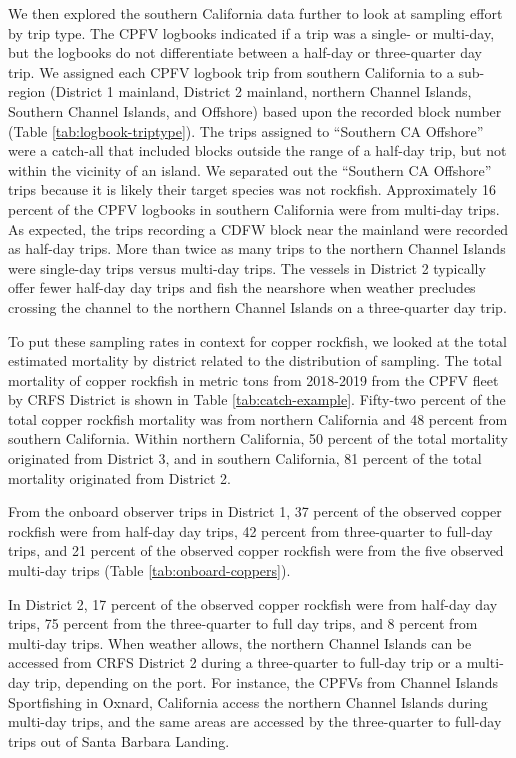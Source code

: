 \documentclass[11pt,
  english,
  letterpaper,
]{article}
\begin{document}
We then explored the southern California data further to look at sampling effort by trip type. The CPFV logbooks indicated if a trip was a single- or multi-day, but the logbooks do not differentiate between a half-day or three-quarter day trip. We assigned each CPFV logbook trip from southern California to a sub-region (District 1 mainland, District 2 mainland, northern Channel Islands, Southern Channel Islands, and Offshore) based upon the recorded block number (Table \ref{tab:logbook-triptype}). The trips assigned to ``Southern CA Offshore'' were a catch-all that included blocks outside the range of a half-day trip, but not within the vicinity of an island. We separated out the ``Southern CA Offshore'' trips because it is likely their target species was not rockfish. Approximately 16 percent of the CPFV logbooks in southern California were from multi-day trips. As expected, the trips recording a CDFW block near the mainland were recorded as half-day trips. More than twice as many trips to the northern Channel Islands were single-day trips versus multi-day trips. The vessels in District 2 typically offer fewer half-day day trips and fish the nearshore when weather precludes crossing the channel to the northern Channel Islands on a three-quarter day trip.

To put these sampling rates in context for copper rockfish, we looked at the total estimated mortality by district related to the distribution of sampling. The total mortality of copper rockfish in metric tons from 2018-2019 from the CPFV fleet by CRFS District is shown in Table \ref{tab:catch-example}. Fifty-two percent of the total copper rockfish mortality was from northern California and 48 percent from southern California. Within northern California, 50 percent of the total mortality originated from District 3, and in southern California, 81 percent of the total mortality originated from District 2.

From the onboard observer trips in District 1, 37 percent of the observed copper rockfish were from half-day day trips, 42 percent from three-quarter to full-day trips, and 21 percent of the observed copper rockfish were from the five observed multi-day trips (Table \ref{tab:onboard-coppers}).

In District 2, 17 percent of the observed copper rockfish were from half-day day trips, 75 percent from the three-quarter to full day trips, and 8 percent from multi-day trips. When weather allows, the northern Channel Islands can be accessed from CRFS District 2 during a three-quarter to full-day trip or a multi-day trip, depending on the port. For instance, the CPFVs from Channel Islands Sportfishing in Oxnard, California access the northern Channel Islands during multi-day trips, and the same areas are accessed by the three-quarter to full-day trips out of Santa Barbara Landing.
\end{document}
